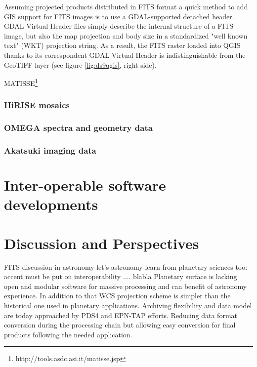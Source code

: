 Assuming projected products distributed in FITS format a quick method to add GIS support for
FITS images is to use a GDAL-supported detached header.
GDAL Virtual Header files simply describe the internal structure of a FITS image, but
also the map projection and body size in a standardized "well known text"
(WKT) projection string.
As a result, the FITS raster loaded into QGIS thanks to its correspondent GDAL Virtual Header
is indistinguishable from the GeoTIFF layer (see figure \ref{fig:ds9qgis}, right side).

MATISSE\footnote{http://tools.asdc.asi.it/matisse.jsp} \citep{ZINZI2016}

\subsubsection{HiRISE mosaics}

\subsubsection{OMEGA spectra and geometry data}


\subsubsection{Akatsuki imaging data}
\section{Inter-operable software developments}
\label{sec:softdev}

\section{Discussion and Perspectives}
\label{sec:disc}
FITS discussion in astronomy\citep{THOMAS2015133} 
let's astronomy learn from planetary sciences too: accent must be put on interoperability
.... blabla
Planetary surface is lacking open and modular software for massive processing and can benefit
of astronomy experience. In addition to that WCS projection scheme is simpler than the
historical one used in planetary applications. 
Archiving flexibility and data model are today approached by PDS4 and EPN-TAP efforts.
Reducing data format conversion during the processing chain but
allowing easy conversion for final products following the needed application.

%
%
%
%

